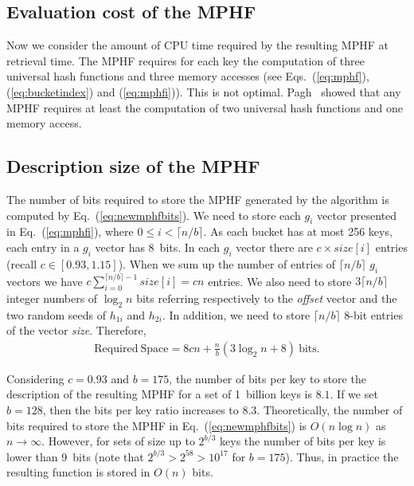 \vspace{-1mm}
\subsection{Evaluation cost of the MPHF} 

Now we consider the amount of CPU time 
required by the resulting MPHF at retrieval time.
The MPHF requires for each key the computation of three 
universal hash functions and three memory accesses 
(see Eqs.~(\ref{eq:mphf}), (\ref{eq:bucketindex}) and (\ref{eq:mphfi})).
This is not optimal. Pagh~\cite{p99} showed that any MPHF requires 
at least the computation of two universal hash functions and one memory
access.

\subsection{Description size of the MPHF} 

The number of bits required to store the MPHF generated by the algorithm 
is computed by Eq.~(\ref{eq:newmphfbits}). 
We need to store each $g_i$ vector presented in Eq.~(\ref{eq:mphfi}), where
$0\leq i < \lceil n/b \rceil$. As each bucket has at most 256 keys, each 
entry in a $g_i$ vector has 8~bits.  In each $g_i$ vector there are 
$c \times \mathit{size}[i]$ entries (recall $c\in[0.93, 1.15]$).
When we sum up the number of entries of $\lceil n/b \rceil$ $g_i$ vectors we have
$c\sum_{i=0}^{\lceil n/b \rceil -1} \mathit{size}[i]=cn$ entries.  We also need to
store $3 \lceil n/b \rceil$ integer numbers of 
$\log_2n$ bits referring respectively to the {\it offset} vector and the two random seeds of
$h_{1i}$ and $h_{2i}$. In addition, we need to store $\lceil n/b \rceil$ 8-bit entries of 
the vector {\it size}.  Therefore, 
\begin{eqnarray}\label{eq:newmphfbits}
\mathrm{Required\: Space} = 8cn + \frac{n}{b}\left( 3\log_2n +8\right) \:
\mathrm{bits}. 
\end{eqnarray}

Considering $c=0.93$ and $b=175$, the number of bits per key to store 
the description of the resulting MPHF for a set of 1~billion keys is $8.1$.
If we set $b=128$, then the bits per key ratio increases to $8.3$.
Theoretically, the number of bits required to store the MPHF in
Eq.~(\ref{eq:newmphfbits}) 
is $O(n\log n)$ as~$n\to\infty$. However, for sets of size up to $2^{b/3}$ keys 
the number of bits per key is lower than 9~bits (note that
$2^{b/3}>2^{58}>10^{17}$ for $b=175$).  
Thus, in practice the resulting function is stored in $O(n)$ bits.
